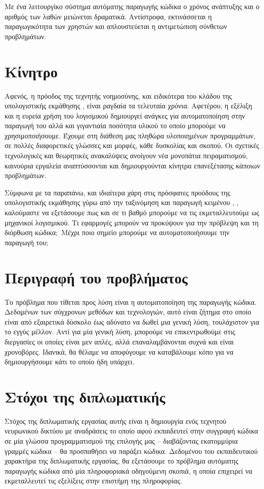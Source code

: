 Με ένα λειτουργίκο σύστημα αυτόματης παραγωγής κώδικα ο χρόνος ανάπτυξης και ο αριθμός των λαθών μειώνεται δραματικά. 
Αντίστροφα, εκτινάσσεται η παραγωγικότητα των χρηστών και απλουστεύεται η αντιμετώπιση σύνθετων προβλημάτων.

\section{Κίνητρο}
Αφενός, η πρόοδος της τεχνητής νοημοσύνης, και ειδικότερα του κλάδου της υπολογιστικής εκμάθησης , είναι ραγδαία τα τελευταία χρόνια.
Αφετέρου, η εξέλιξη και η ευρεία χρήση του λογισμικού δημιουργεί ανάγκες για αυτοματοποίηση στην παραγωγή του αλλά και γιγαντιαία ποσότητα υλικού το οποίο μπορούμε να χρησιμοποιήσουμε.
Έχουμε στη διάθεση μας πληθώρα υλοποιημένων προγραμμάτων, σε πολλές διαφορετικές γλώσσες και μορφές, κάθε δυσκολίας και σκοπού.
Οι σχετικές τεχνολογικές και θεωρητικές ανακαλύψεις ανοίγουν νέα μονοπάτια πειραματισμού, καινούρια εργαλεία αναπτύσσονται και δημιουργούνται κίνητρα επανεξέτασης κάποιων προβλημάτων.

Σύμφωνα με τα παραπάνω, και ιδιαίτερα χάρη στις πρόσφατες προόδους της υπολογιστικής εκμάθησης γύρω από την ταξινόμηση και παραγωγή κειμένου \cite{Graves2013}, \cite{Liu2016}, καλούμαστε να εξετάσουμε πως και σε τι βαθμό μπορούμε να τις εκμεταλλευτούμε ως μηχανικοί λογισμικού. Τι εφαρμογές μπορούν να προκύψουν για την πρόβλεψη και τη διόρθωση κώδικα$;$ Μέχρι ποιο σημείο μπορούμε να αυτοματοποιήσουμε την παραγωγή του$;$

\section{Περιγραφή του προβλήματος}
Το πρόβλημα που τίθεται προς λύση είναι η αυτοματοποίηση της παραγωγής κώδικα. 
Δεδομένων των σύγχρονων μεθόδων και τεχνολογιών, αυτό είναι ζήτημα στο οποίο είναι από εξαιρετικά δύσκολο έως αδύνατο να δωθεί μια γενική λύση, τουλάχιστον για το εγγύς μέλλον.
Αντί για μία γενική λύση, μπορούμε να επικεντρωθούμε στις διεργασίες οι οποίες είναι μεν απλές, αλλά επαναλαμβάνονται συχνά και είναι χρονοβόρες.
Ιδανικά, θα θέλαμε να αποφύγουμε να καταβάλουμε κόπο για να δημιουργήσουμε κάτι το οποίο ήδη υπάρχει. 

\section{Στόχοι της διπλωματικής}

Στόχος της διπλωματικής εργασίας αυτής είναι η δημιουργία ενός τεχνητού νευρωνικού δικτύου με αναδράσεις  το οποίο αφού εκπαιδευτεί στην συγγραφή κώδικα σε μία γλώσσα προγραμματισμού της επιλογής μας -- διαβάζοντας εκατομμύρια γραμμές κώδικα -- θα προσπαθήσει να παράξει κώδικα. Δεδομένου του εκπαιδευτικού χαρακτήρα της διπλωματικής εργασίας, θα εξετάσουμε το πρόβλημα αυτόματης παραγωγής κώδικα από μία πληροφοριακά οδηγούμενη  σκοπιά, η οποία επιχειρεί να εκμεταλλευτεί τις εξελίξεις στην επιστήμη της πληροφορίας.

